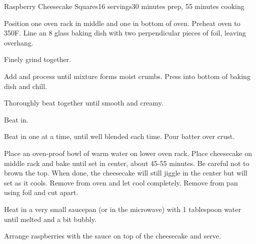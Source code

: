 \documentclass[../Cookbook.tex]{subfiles}
\begin{document}
\begin{recipe}{Raspberry Cheesecake Squares}{16 servings}{30 minutes prep, 55 minutes cooking}

Position one oven rack in middle and one in bottom of oven. Preheat oven to 350\0F. Line an 8 glass baking dish with two perpendicular pieces of foil, leaving overhang.

Finely grind together.

Add and process until mixture forms moist crumbs. Press into bottom of baking dish and chill.

Thoroughly beat together until smooth and creamy.

Beat in.

Beat in one at a time, until well blended each time. Pour batter over crust.

Place an oven-proof bowl of warm water on lower oven rack. Place cheesecake on middle rack and bake until set in center, about 45-55 minutes. Be careful not to brown the top.
When done, the cheesecake will still jiggle in the center but will set as it cools.
Remove from oven and let cool completely. Remove from pan using foil and cut apart.

Heat in a very small saucepan (or in the microwave) with 1 tablespoon water until melted and a bit bubbly.

Arrange raspberries with the sauce on top of the cheesecake and serve.

\end{recipe}
\end{document}
